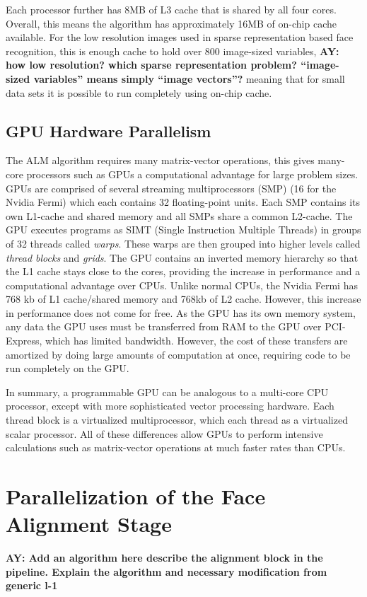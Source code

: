 \documentclass[10pt,twocolumn,letterpaper]{article}
\begin{document}
Each processor further has 8MB of L3 cache that is shared by all four cores.
Overall, this means the algorithm has approximately 16MB of on-chip cache
available.  For the low resolution images used in sparse representation based
face recognition, this is enough cache to hold over 800 image-sized variables,
{\bf AY: how low resolution? which sparse representation problem? ``image-sized
variables'' means simply ``image vectors''?} meaning that for small data sets
it is possible to run completely using on-chip cache.

\subsection{GPU Hardware Parallelism}

The ALM algorithm requires many matrix-vector operations, this gives many-core
processors such as GPUs a computational advantage for large problem sizes.
GPUs are comprised of several streaming multiprocessors (SMP) (16 for the
Nvidia Fermi) which each contains 32 floating-point units.  Each SMP contains
its own L1-cache and shared memory and all SMPs share a common L2-cache.  The
GPU executes programs as SIMT (Single Instruction Multiple Threads) in groups
of 32 threads called \emph{warps}.  These warps are then grouped into higher
levels called \emph{thread blocks} and \emph{grids}. The GPU contains an
inverted memory hierarchy so that the L1 cache stays close to the cores,
providing the increase in performance and a computational advantage over CPUs.
Unlike normal CPUs, the Nvidia Fermi has 768 kb of L1 cache/shared memory and
768kb of L2 cache. However, this increase in performance does not come for
free. As the GPU has its own memory system, any data the GPU uses must be
transferred from RAM to the GPU over PCI-Express, which has limited bandwidth.
However, the cost of these transfers are amortized by doing large amounts of
computation at once, requiring code to be run completely on the GPU.  

In summary, a programmable GPU can be analogous to a multi-core CPU processor,
except with more sophisticated vector processing hardware.  Each thread block
is a virtualized multiprocessor, which each thread as a virtualized scalar
processor.  All of these differences allow GPUs to perform intensive
calculations such as matrix-vector operations at much faster rates than CPUs. 

\section{Parallelization of the Face Alignment Stage}
\label{sec:alignment}
{\bf AY: Add an algorithm here describe the alignment block in the pipeline. Explain the algorithm and necessary modification from generic l-1}
\end{document}
